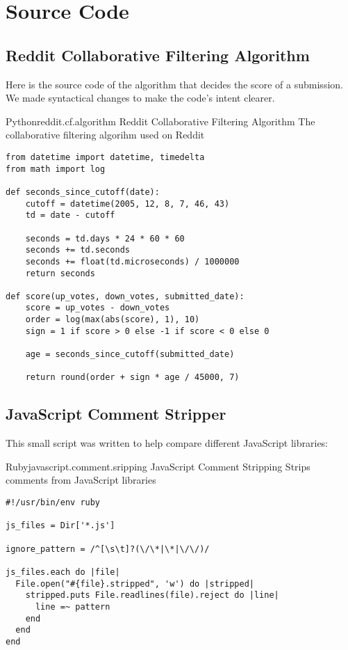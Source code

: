 \chapter{Source Code}

\section{Reddit Collaborative Filtering Algorithm}
\label{section:source.code.reddit}

Here is the source code of the algorithm that decides the score of a
submission. We made syntactical changes to make the code's intent clearer.

\begin{scode}{Python}{reddit.cf.algorithm}{%
  Reddit Collaborative Filtering Algorithm}{%
  The collaborative filtering algorihm used on Reddit}
\begin{lstlisting}
from datetime import datetime, timedelta
from math import log

def seconds_since_cutoff(date):
    cutoff = datetime(2005, 12, 8, 7, 46, 43)
    td = date - cutoff

    seconds = td.days * 24 * 60 * 60
    seconds += td.seconds
    seconds += float(td.microseconds) / 1000000
    return seconds

def score(up_votes, down_votes, submitted_date):
    score = up_votes - down_votes
    order = log(max(abs(score), 1), 10)
    sign = 1 if score > 0 else -1 if score < 0 else 0

    age = seconds_since_cutoff(submitted_date)

    return round(order + sign * age / 45000, 7)
\end{lstlisting}
\end{scode}


\section{JavaScript Comment Stripper}
\label{section:source.code.javascript.comment.stripper}

This small script was written to help
compare different JavaScript libraries:


\begin{scode}{Ruby}{javascript.comment.sripping}{%
  JavaScript Comment Stripping}{%
  Strips comments from JavaScript libraries}
\begin{lstlisting}
#!/usr/bin/env ruby

js_files = Dir['*.js']

ignore_pattern = /^[\s\t]?(\/\*|\*|\/\/)/

js_files.each do |file|
  File.open("#{file}.stripped", 'w') do |stripped| 
    stripped.puts File.readlines(file).reject do |line|
      line =~ pattern
    end
  end
end
\end{lstlisting}
\end{scode}

